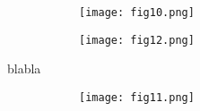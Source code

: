 \begin{figure}[!th]
\centering
\hfill
\begin{subfigure}[t]{0.49\textwidth}
\centering
\texttt{[image: fig10.png]}
\caption{}
\label{subfig:LZsweepY}
\end{subfigure}
%
\hfill
\begin{subfigure}[t]{0.49\textwidth}
\centering
\texttt{[image: fig12.png]}
\caption{}
\label{subfig:LZsweepb}
\end{subfigure}
\hfill
\caption{}
\label{fig:LZsweep1d}
\end{figure}

blabla

\begin{figure}[!th]
\centering
\hfill
\begin{subfigure}[t]{0.49\textwidth}
\centering
\texttt{[image: fig11.png]}
\caption{}
\label{subfig:LZsweepYspecialorbit}
\end{subfigure}
%
\hfill
\begin{subfigure}[t]{0.49\textwidth}
\centering
\caption{}
\end{subfigure}
\hfill
\caption{}
\end{figure}


